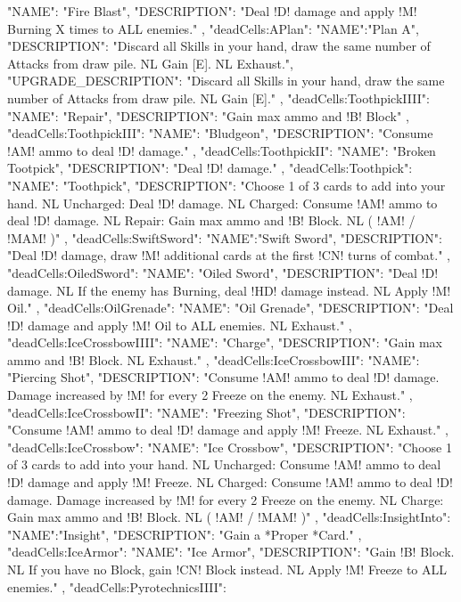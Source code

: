 {{    "NAME": "Fire Blast",
    "DESCRIPTION": "Deal !D! damage and apply !M! Burning X times to ALL enemies."
  },
  "deadCells:APlan": {
    "NAME":"Plan A",
    "DESCRIPTION": "Discard all Skills in your hand, draw the same number of Attacks from draw pile. NL Gain [E]. NL Exhaust.",
    "UPGRADE_DESCRIPTION": "Discard all Skills in your hand, draw the same number of Attacks from draw pile. NL Gain [E]."
  },
  "deadCells:ToothpickIIII": {
    "NAME": "Repair",
    "DESCRIPTION": "Gain max ammo and !B! Block"
  },
  "deadCells:ToothpickIII": {
    "NAME": "Bludgeon",
    "DESCRIPTION": "Consume !AM! ammo to deal !D! damage."
  },
  "deadCells:ToothpickII": {
    "NAME": "Broken Tootpick",
    "DESCRIPTION": "Deal !D! damage."
  },
  "deadCells:Toothpick": {
    "NAME": "Toothpick",
    "DESCRIPTION": "Choose 1 of 3 cards to add into your hand. NL Uncharged: Deal !D! damage. NL Charged: Consume !AM! ammo to deal !D! damage. NL Repair: Gain max ammo and !B! Block. NL ( !AM! / !MAM! )"
  },
  "deadCells:SwiftSword": {
    "NAME":"Swift Sword",
    "DESCRIPTION": "Deal !D! damage, draw !M! additional cards at the first !CN! turns of combat."
  },
  "deadCells:OiledSword": {
    "NAME": "Oiled Sword",
    "DESCRIPTION": "Deal !D! damage. NL If the enemy has Burning, deal !HD! damage instead. NL Apply !M! Oil."
  },
  "deadCells:OilGrenade": {
    "NAME": "Oil Grenade",
    "DESCRIPTION": "Deal !D! damage and apply !M! Oil to ALL enemies. NL Exhaust."
  },
  "deadCells:IceCrossbowIIII": {
    "NAME": "Charge",
    "DESCRIPTION": "Gain max ammo and !B! Block. NL Exhaust."
  },
  "deadCells:IceCrossbowIII": {
    "NAME": "Piercing Shot",
    "DESCRIPTION": "Consume !AM! ammo to deal !D! damage. Damage increased by !M! for every 2 Freeze on the enemy. NL Exhaust."
  },
  "deadCells:IceCrossbowII":{
    "NAME": "Freezing Shot",
    "DESCRIPTION": "Consume !AM! ammo to deal !D! damage and apply !M! Freeze. NL Exhaust."
  },
  "deadCells:IceCrossbow": {
    "NAME": "Ice Crossbow",
    "DESCRIPTION": "Choose 1 of 3 cards to add into your hand. NL Uncharged: Consume !AM! ammo to deal !D! damage and apply !M! Freeze. NL Charged: Consume !AM! ammo to deal !D! damage. Damage increased by !M! for every 2 Freeze on the enemy. NL Charge: Gain max ammo and !B! Block. NL ( !AM! / !MAM! )"
  },
  "deadCells:InsightInto": {
    "NAME":"Insight",
    "DESCRIPTION": "Gain a *Proper *Card."
  },
  "deadCells:IceArmor": {
    "NAME": "Ice Armor",
    "DESCRIPTION": "Gain !B! Block. NL If you have no Block, gain !CN! Block instead. NL Apply !M! Freeze to ALL enemies."
  },
  "deadCells:PyrotechnicsIIII": {
}}
